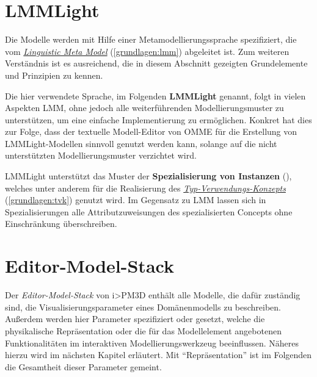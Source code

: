 \documentclass[a4paper,10pt]{sphinxmanual}
\begin{document}
\section{LMMLight}
\label{modellhierarchie:lmmlight}\label{modellhierarchie:id2}
Die Modelle werden mit Hilfe einer Metamodellierungssprache spezifiziert, die vom {\hyperref[grundlagen:lmm]{\emph{Linguistic Meta Model}}} (\autoref*{grundlagen:lmm}) abgeleitet ist.
Zum weiteren Verständnis ist es ausreichend, die in diesem Abschnitt gezeigten Grundelemente und Prinzipien zu kennen.

Die hier verwendete Sprache, im Folgenden \textbf{LMMLight} genannt, folgt in vielen Aspekten LMM, ohne jedoch alle weiterführenden Modellierungsmuster zu unterstützen, um eine einfache Implementierung zu ermöglichen.
Konkret hat dies zur Folge, dass der textuelle Modell-Editor von OMME für die Erstellung von LMMLight-Modellen sinnvoll genutzt werden kann, solange auf die nicht unterstützten Modellierungsmuster verzichtet wird.

LMMLight unterstützt das Muster der \textbf{Spezialisierung von Instanzen} (), welches unter anderem für die Realisierung des {\hyperref[grundlagen:tvk]{\emph{Typ-Verwendungs-Konzepts}}} (\autoref*{grundlagen:tvk}) genutzt wird.
Im Gegensatz zu LMM lassen sich in Spezialisierungen alle Attributzuweisungen des spezialisierten Concepts ohne Einschränkung überschreiben.


\section{Editor-Model-Stack}
\label{modellhierarchie:id3}\label{modellhierarchie:editor-model-stack}
Der \emph{Editor-Model-Stack} von i\textgreater{}PM3D enthält alle Modelle, die dafür zuständig sind, die Visualisierungsparameter eines Domänenmodells zu beschreiben.
Außerdem werden hier Parameter spezifiziert oder gesetzt, welche die physikalische Repräsentation oder die für das Modellelement angebotenen Funktionalitäten im interaktiven Modellierungswerkzeug beeinflussen.
Näheres hierzu wird im nächsten Kapitel erläutert.
Mit "`Repräsentation"' ist im Folgenden die Gesamtheit dieser Parameter gemeint.
\end{document}
